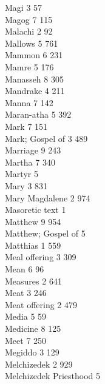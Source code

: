 Magi \hfill 3 \quad \phantom{0}\phantom{0}57\\
Magog \hfill 7 \quad \phantom{0}115\\
Malachi \hfill 2 \quad \phantom{0}\phantom{0}92\\
Mallows \hfill 5 \quad \phantom{0}761\\
Mammon \hfill 6 \quad \phantom{0}231\\
Mamre \hfill 5 \quad \phantom{0}176\\
Manasseh \hfill 8 \quad \phantom{0}305\\
Mandrake \hfill 4 \quad \phantom{0}211\\
Manna \hfill 7 \quad \phantom{0}142\\
Maran-atha \hfill 5 \quad \phantom{0}392\\
Mark \hfill 7 \quad \phantom{0}151\\
Mark; Gospel of \hfill 3 \quad \phantom{0}489\\
Marriage \hfill 9 \quad \phantom{0}243\\
Martha \hfill 7 \quad \phantom{0}340\\
Martyr \hfill 5 \\
Mary \hfill 3 \quad \phantom{0}831\\
Mary Magdalene \hfill 2 \quad \phantom{0}974\\
Masoretic text \hfill 1 \\
Matthew \hfill 9 \quad \phantom{0}954\\
Matthew; Gospel of \hfill 5 \\
Matthias \hfill 1 \quad \phantom{0}559\\
Meal offering \hfill 3 \quad \phantom{0}309\\
Mean \hfill 6 \quad \phantom{0}\phantom{0}96\\
Measures \hfill 2 \quad \phantom{0}641\\
Meat \hfill 3 \quad \phantom{0}246\\
Meat offering \hfill 2 \quad \phantom{0}479\\
Media \hfill 5 \quad \phantom{0}\phantom{0}59\\
Medicine \hfill 8 \quad \phantom{0}125\\
Meet \hfill 7 \quad \phantom{0}250\\
Megiddo \hfill 3 \quad \phantom{0}129\\
Melchizedek \hfill 2 \quad \phantom{0}929\\
Melchizedek Priesthood \hfill 5 \\
